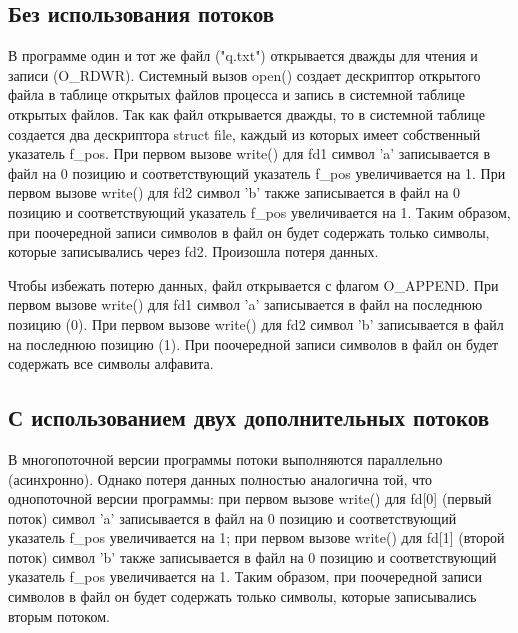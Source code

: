\subsection{Без использования потоков}


\clearpage


В программе один и тот же файл ("q.txt") открывается дважды для чтения и записи (O\_RDWR).
Системный вызов open() создает дескриптор открытого файла в таблице открытых файлов процесса и запись в системной таблице открытых файлов.
Так как файл открывается дважды, то в системной таблице создается два дескриптора struct file, каждый из которых имеет собственный указатель f\_pos.
При первом вызове write() для fd1 символ 'a' записывается в файл на 0 позицию и соответствующий указатель f\_pos увеличивается на 1.
При первом вызове write() для fd2 символ 'b' также записывается в файл на 0 позицию и соответствующий указатель f\_pos увеличивается на 1.
Таким образом, при поочередной записи символов в файл он будет содержать только символы, которые записывались через fd2.
Произошла потеря данных.

Чтобы избежать потерю данных, файл открывается с флагом O\_APPEND.
При первом вызове write() для fd1 символ 'a' записывается в файл на последнюю позицию (0).
При первом вызове write() для fd2 символ 'b' записывается в файл на последнюю позицию (1).
При поочередной записи символов в файл он будет содержать все символы алфавита.

\clearpage

\subsection{С использованием двух дополнительных потоков}



В многопоточной версии программы потоки выполняются параллельно (асинхронно).
Однако потеря данных полностью аналогична той, что однопоточной версии программы: при первом вызове write() для fd[0] (первый поток) символ 'a' записывается в файл на 0 позицию и соответствующий указатель f\_pos увеличивается на 1; при первом вызове write() для fd[1] (второй поток) символ 'b' также записывается в файл на 0 позицию и соответствующий указатель f\_pos увеличивается на 1.
Таким образом, при поочередной записи символов в файл он будет содержать только символы, которые записывались вторым потоком.

